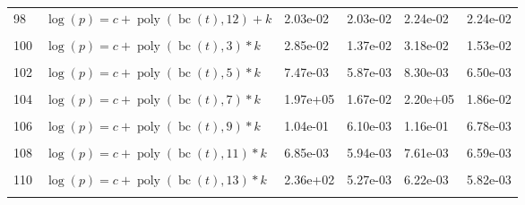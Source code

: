 \documentclass[12pt,a4paper]{article}
\DeclareMathOperator{\bc}{bc}
\DeclareMathOperator{\poly}{poly}
\begin{document}
\begin{longtable}[t]{ll>{\raggedleft\arraybackslash}p{2cm}>{\raggedleft\arraybackslash}p{2cm}>{\raggedleft\arraybackslash}p{2cm}>{\raggedleft\arraybackslash}p{2cm}}
98 & $\log(p) = c + \poly\left( \bc(t), 12 \right) + k$ & 2.03e-02 & 2.03e-02 & 2.24e-02 & 2.24e-02\\
\cellcolor{gray!6}{99} & \cellcolor{gray!6}{$\log(p) = c + \poly\left( \bc(t), 13 \right) + k$} & \cellcolor{gray!6}{5.37e+00} & \cellcolor{gray!6}{2.10e-02} & \cellcolor{gray!6}{6.00e+00} & \cellcolor{gray!6}{2.32e-02}\\
100 & $\log(p) = c + \poly\left( \bc(t), 3 \right) * k$ & 2.85e-02 & 1.37e-02 & 3.18e-02 & 1.53e-02\\
\cellcolor{gray!6}{101} & \cellcolor{gray!6}{$\log(p) = c + \poly\left( \bc(t), 4 \right) * k$} & \cellcolor{gray!6}{1.13e-02} & \cellcolor{gray!6}{1.13e-02} & \cellcolor{gray!6}{1.26e-02} & \cellcolor{gray!6}{1.26e-02}\\
102 & $\log(p) = c + \poly\left( \bc(t), 5 \right) * k$ & 7.47e-03 & 5.87e-03 & 8.30e-03 & 6.50e-03\\
\cellcolor{gray!6}{103} & \cellcolor{gray!6}{$\log(p) = c + \poly\left( \bc(t), 6 \right) * k$} & \cellcolor{gray!6}{8.95e-03} & \cellcolor{gray!6}{8.11e-03} & \cellcolor{gray!6}{9.97e-03} & \cellcolor{gray!6}{9.02e-03}\\
104 & $\log(p) = c + \poly\left( \bc(t), 7 \right) * k$ & 1.97e+05 & 1.67e-02 & 2.20e+05 & 1.86e-02\\
\cellcolor{gray!6}{105} & \cellcolor{gray!6}{$\log(p) = c + \poly\left( \bc(t), 8 \right) * k$} & \cellcolor{gray!6}{1.59e-02} & \cellcolor{gray!6}{1.20e-02} & \cellcolor{gray!6}{1.78e-02} & \cellcolor{gray!6}{1.34e-02}\\
106 & $\log(p) = c + \poly\left( \bc(t), 9 \right) * k$ & 1.04e-01 & 6.10e-03 & 1.16e-01 & 6.78e-03\\
\cellcolor{gray!6}{107} & \cellcolor{gray!6}{$\log(p) = c + \poly\left( \bc(t), 10 \right) * k$} & \cellcolor{gray!6}{5.25e-03} & \cellcolor{gray!6}{5.12e-03} & \cellcolor{gray!6}{5.81e-03} & \cellcolor{gray!6}{5.67e-03}\\
108 & $\log(p) = c + \poly\left( \bc(t), 11 \right) * k$ & 6.85e-03 & 5.94e-03 & 7.61e-03 & 6.59e-03\\
\cellcolor{gray!6}{109} & \cellcolor{gray!6}{$\log(p) = c + \poly\left( \bc(t), 12 \right) * k$} & \cellcolor{gray!6}{1.64e+00} & \cellcolor{gray!6}{7.03e-03} & \cellcolor{gray!6}{1.83e+00} & \cellcolor{gray!6}{7.80e-03}\\
110 & $\log(p) = c + \poly\left( \bc(t), 13 \right) * k$ & 2.36e+02 & 5.27e-03 & 6.22e-03 & 5.82e-03\\
\cellcolor{gray!6}{111} & \cellcolor{gray!6}{$\log(p) = c + \poly\left( \bc(t), 3 \right) + \log(k)$} & \cellcolor{gray!6}{3.07e-02} & \cellcolor{gray!6}{2.33e-02} & \cellcolor{gray!6}{3.41e-02} & \cellcolor{gray!6}{2.58e-02}\\

\end{longtable}
\end{document}
